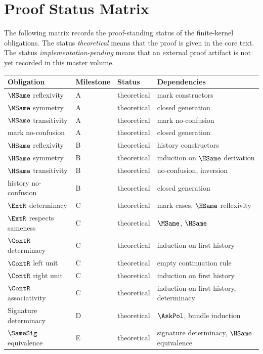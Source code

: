 
\chapter{Proof Status Matrix}
\label{ch:proof-standing-proof-status-matrix}

The following matrix records the proof-standing status of the finite-kernel obligations. The status \emph{theoretical} means that the proof is given in the core text. The status \emph{implementation-pending} means that an external proof artifact is not yet recorded in this master volume.

\begin{longtable}{p{}p{}p{}p{}}
\toprule
\textbf{Obligation} & \textbf{Milestone} & \textbf{Status} & \textbf{Dependencies}\\
\midrule
\(\MSame\) reflexivity & A & theoretical & mark constructors\\
\(\MSame\) symmetry & A & theoretical & closed generation\\
\(\MSame\) transitivity & A & theoretical & mark no-confusion\\
mark no-confusion & A & theoretical & closed generation\\
\(\HSame\) reflexivity & B & theoretical & history constructors\\
\(\HSame\) symmetry & B & theoretical & induction on \(\HSame\) derivation\\
\(\HSame\) transitivity & B & theoretical & no-confusion, inversion\\
history no-confusion & B & theoretical & closed generation\\
\(\ExtR\) determinacy & C & theoretical & mark cases, \(\HSame\) reflexivity\\
\(\ExtR\) respects sameness & C & theoretical & \(\MSame\), \(\HSame\)\\
\(\ContR\) determinacy & C & theoretical & induction on first history\\
\(\ContR\) left unit & C & theoretical & empty continuation rule\\
\(\ContR\) right unit & C & theoretical & induction on first history\\
\(\ContR\) associativity & C & theoretical & induction on first history, determinacy\\
Signature determinacy & D & theoretical & \(\AskPol\), bundle induction\\
\(\SameSig\) equivalence & E & theoretical & signature determinacy, \(\HSame\) equivalence\\

\end{longtable}
